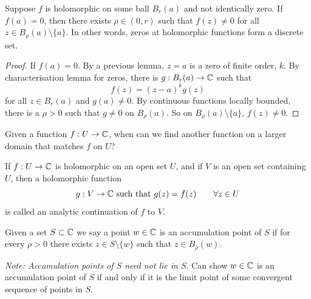 \documentclass[10pt, a4paper]{article}
\begin{document}
\begin{proposition}
    Suppose $f$ is holomorphic on some ball $B_r(a)$ and not identically zero.
    If $f(a) = 0$,
    then there exists $\rho \in (0, r)$ such that $f(z) \neq 0$ for all $z \in B_{\rho}(a) \setminus \{a\}$.
    In other words,
    zeros at holomorphic functions form a discrete set.

    \begin{proof}
        If $f(a) = 0$.
        By a previous lemma,
        $z = a$ is a zero of finite order,
        $k$.
        By characterisation lemma for zeros,
        there is $g : B_r(a) \to \mathbb{C}$ such that
        \[
        f(z) = (z - a) ^ kg(z)
        \]
        for all $z \in B_r(a)$ and $g(a) \neq 0$.
        By continuous functions locally bounded,
        there is a $\rho > 0$ such that $g \neq 0$ on $B_{\rho}(a)$.
        So on $B_{\rho}(a) \setminus \{a\}$,
        $f(z) \neq 0$.
    \end{proof}
\end{proposition}

Given a function $f : U \to \mathbb{C}$,
when can we find another function on a larger domain that matches $f$ on $U$?

\begin{definition}
    If $f : U \to \mathbb{C}$ is holomorphic on an open set $U$,
    and if $V$ is an open set containing $U$,
    then a holomorphic function
    \[
    g : V \to \mathbb{C} \text{ such that } g(z) = f(z)\qquad \forall z \in U
    \]
    is called an analytic continuation of $f$ to $V$.
\end{definition}

\begin{definition}
    Given a set $S \subset \mathbb{C}$ we say a point $w \in \mathbb{C}$ is an accumulation point of $S$ if for every $\rho > 0$ there exists $z \in S \setminus\{w\}$ such that $z \in B_{\rho}(w)$.
\end{definition}

\textit{Note:
Accumulation points of $S$ need not lie in $S$}.
Can show $w \in \mathbb{C}$ is an accumulation point of $S$ if and only if it is the limit point of some convergent sequence of points in $S$.
\end{document}
